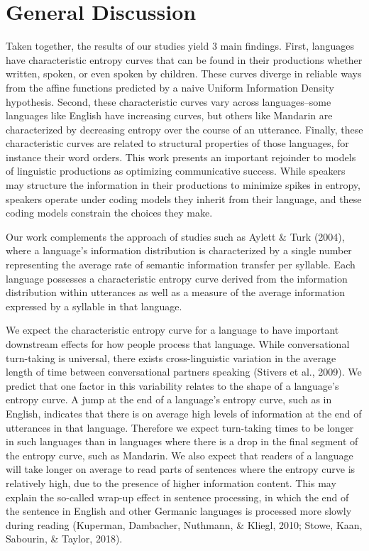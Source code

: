 \documentclass[10pt, letterpaper]{article}
\begin{document}
\section{General Discussion}\label{general-discussion}

Taken together, the results of our studies yield 3 main findings. First,
languages have characteristic entropy curves that can be found in their
productions whether written, spoken, or even spoken by children. These
curves diverge in reliable ways from the affine functions predicted by a
naive Uniform Information Density hypothesis. Second, these
characteristic curves vary across languages--some languages like English
have increasing curves, but others like Mandarin are characterized by
decreasing entropy over the course of an utterance. Finally, these
characteristic curves are related to structural properties of those
languages, for instance their word orders. This work presents an
important rejoinder to models of linguistic productions as optimizing
communicative success. While speakers may structure the information in
their productions to minimize spikes in entropy, speakers operate under
coding models they inherit from their language, and these coding models
constrain the choices they make.

Our work complements the approach of studies such as Aylett \& Turk
(2004), where a language's information distribution is characterized by
a single number representing the average rate of semantic information
transfer per syllable. Each language possesses a characteristic entropy
curve derived from the information distribution within utterances as
well as a measure of the average information expressed by a syllable in
that language.

We expect the characteristic entropy curve for a language to have
important downstream effects for how people process that language. While
conversational turn-taking is universal, there exists cross-linguistic
variation in the average length of time between conversational partners
speaking (Stivers et al., 2009). We predict that one factor in this
variability relates to the shape of a language's entropy curve. A jump
at the end of a language's entropy curve, such as in English, indicates
that there is on average high levels of information at the end of
utterances in that language. Therefore we expect turn-taking times to be
longer in such languages than in languages where there is a drop in the
final segment of the entropy curve, such as Mandarin. We also expect
that readers of a language will take longer on average to read parts of
sentences where the entropy curve is relatively high, due to the
presence of higher information content. This may explain the so-called
wrap-up effect in sentence processing, in which the end of the sentence
in English and other Germanic languages is processed more slowly during
reading (Kuperman, Dambacher, Nuthmann, \& Kliegl, 2010; Stowe, Kaan,
Sabourin, \& Taylor, 2018).
\end{document}
